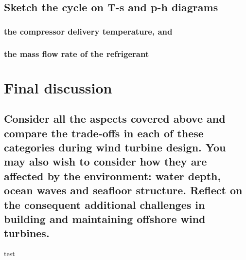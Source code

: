 \documentclass[12pt]{article}
\numberwithin{equation}{section}
\begin{document}
\begin{flushleft}
\subsection{Sketch the cycle on T-s and p-h diagrams}
\subsubsection{the compressor delivery temperature, and}
\subsubsection{the mass flow rate of the refrigerant}

\section{Final discussion}
\subsection{Consider all the aspects covered above and compare the trade-offs in each of these categories during wind turbine design. You may also wish to consider how they are affected by the environment: water depth, ocean waves and seafloor structure. Reflect on the consequent additional challenges in building and maintaining offshore wind turbines.}
test



\end{flushleft}
\end{document}
